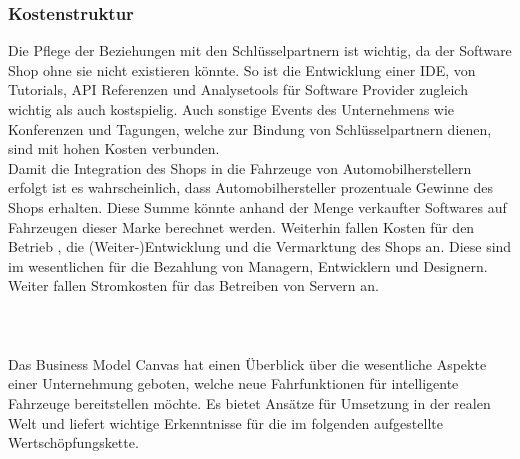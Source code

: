 \subsubsection{Kostenstruktur}
Die Pflege der Beziehungen mit den Schlüsselpartnern ist wichtig, da der Software Shop ohne sie nicht existieren könnte. So ist die Entwicklung einer IDE, von Tutorials, API Referenzen und Analysetools für Software Provider zugleich wichtig als auch kostspielig. Auch sonstige Events des Unternehmens wie Konferenzen und Tagungen, welche zur Bindung von Schlüsselpartnern dienen, sind mit hohen Kosten verbunden.\\
Damit die Integration des Shops in die Fahrzeuge von Automobilherstellern erfolgt ist es wahrscheinlich, dass Automobilhersteller prozentuale Gewinne des Shops erhalten. Diese Summe könnte anhand der Menge verkaufter Softwares auf Fahrzeugen dieser Marke berechnet werden. Weiterhin fallen Kosten für den Betrieb , die (Weiter-)Entwicklung und die Vermarktung des Shops an. Diese sind im wesentlichen für die Bezahlung von Managern, Entwicklern und Designern. Weiter fallen Stromkosten für das Betreiben von Servern an.\\\\\\\\
Das Business Model Canvas hat einen Überblick über die wesentliche Aspekte einer Unternehmung geboten, welche neue Fahrfunktionen für intelligente Fahrzeuge bereitstellen möchte. Es bietet Ansätze für Umsetzung in der realen Welt und liefert wichtige Erkenntnisse für die im folgenden aufgestellte Wertschöpfungskette.